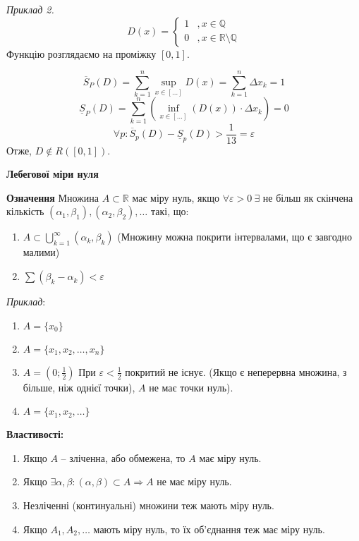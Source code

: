 \documentclass[12pt]{report}
\begin{document}
\textit{Приклад 2.}
$$D(x) =  \begin{cases} 1 &, x \in \mathbb{Q} \\
						  0 &, x \in \mathbb{R} \setminus \mathbb{Q} \end{cases}$$
Функцію розглядаємо на проміжку $[0,1]$.

$$\overline S_{P} (D) = \sum_{k=1}^n \sup_{x \in [\ldots]} D(x) = \sum_{k=1}^n \Delta x_k = 1$$
$$\underline S_{P} (D) = \sum_{k=1}^n( \inf_{x \in [\ldots]} (D(x)) \cdot  \Delta x_k) = 0$$
$$\forall p : \overline S_{p}(D) - \underline S_{p} (D) > \frac{1}{13} =  \varepsilon$$
Отже, $D \notin R([0,1])$.

\begin{center}
	\textbf{ Лебегової міри нуля} 
\end{center}

\textbf{Означення} Множина $A \subset \mathbb{R}$ має міру нуль, якщо $\forall \varepsilon > 0 \ \exists$ не більш як скінчена кількість $ (\alpha_1,\beta_1), (\alpha_2,\beta_2), \ldots$ такі, що:

\begin{enumerate}

\item $A \subset \bigcup_{k=1}^{\infty} (\alpha_k, \beta_k)$ (Множину можна покрити інтервалами, що є завгодно малими)

\item $\sum (\beta_k - \alpha_k) < \varepsilon$

\end{enumerate}

\textit{Приклад}:

\begin{enumerate}

\item $A = \{ x_0\}$
\item $A = \{ x_1, x_2, \ldots, x_n\}$
\item $A = (0; \frac{1}{2})$ При $\varepsilon < \frac{1}{2}$ покритий не існує. (Якщо є неперервна множина, з більше, ніж однієї точки), $A$ не має точки нуль).
\item $A = \{ x_1, x_2, \ldots\}$
\end{enumerate}

\textbf{Властивості:}

\begin{enumerate}

\item Якщо $A$ -- зліченна, або обмежена, то $A$ має міру нуль.
\item Якщо $\exists \alpha, \beta : (\alpha, \beta) \subset A \Longrightarrow A$ не має міру нуль.
\item Незліченні (континуальні) множини теж мають міру нуль.
\item Якщо $A_1, A_2, \ldots$ мають міру нуль, то їх об'єднання теж має міру нуль.  

\end{enumerate}
\end{document}

